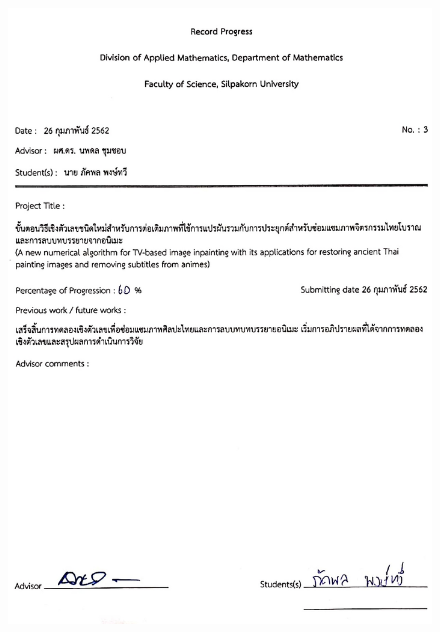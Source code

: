 \begin{figure}
    \includegraphics[width=\linewidth]{image/approval_letter/report_03.jpg}
\end{figure}
\clearpage
